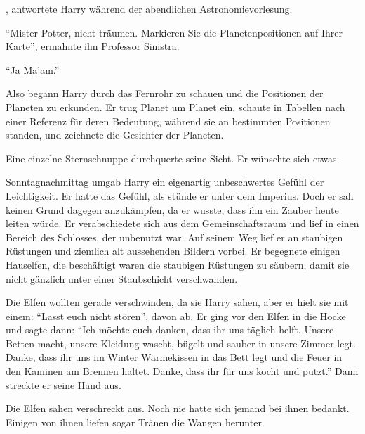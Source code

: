 , antwortete Harry während der abendlichen Astronomievorlesung.


\enquote{Mister Potter, nicht träumen. Markieren Sie die Planetenpositionen auf Ihrer Karte}, ermahnte ihn Professor Sinistra.

\enquote{Ja Ma'am.}

Also begann Harry durch das Fernrohr zu schauen und die Positionen der Planeten zu erkunden. Er trug Planet um Planet ein, schaute in Tabellen nach einer Referenz für deren Bedeutung, während sie an bestimmten Positionen standen, und zeichnete die Gesichter der Planeten.

Eine einzelne Sternschnuppe durchquerte seine Sicht. Er wünschte sich etwas.

\trenn

Sonntagnachmittag umgab Harry ein eigenartig unbeschwertes Gefühl der Leichtigkeit. Er hatte das Gefühl, als stünde er unter dem Imperius. Doch er sah keinen Grund dagegen anzukämpfen, da er wusste, dass ihn ein Zauber heute leiten würde. Er verabschiedete sich aus dem Gemeinschaftsraum und lief in einen Bereich des Schlosses, der unbenutzt war. Auf seinem Weg lief er an staubigen Rüstungen und ziemlich alt aussehenden Bildern vorbei. Er begegnete einigen Hauselfen, die beschäftigt waren die staubigen Rüstungen zu säubern, damit sie nicht gänzlich unter einer Staubschicht verschwanden.

Die Elfen wollten gerade verschwinden, da sie Harry sahen, aber er hielt sie mit einem: \enquote{Lasst euch nicht stören}, davon ab. Er ging vor den Elfen in die Hocke und sagte dann: \enquote{Ich möchte euch danken, dass ihr uns täglich helft. Unsere Betten macht, unsere Kleidung wascht, bügelt und sauber in unsere Zimmer legt. Danke, dass ihr uns im Winter Wärmekissen in das Bett legt und die Feuer in den Kaminen am Brennen haltet. Danke, dass ihr für uns kocht und putzt.} Dann streckte er seine Hand aus.

Die Elfen sahen verschreckt aus. Noch nie hatte sich jemand bei ihnen bedankt. Einigen von ihnen liefen sogar Tränen die Wangen herunter.

